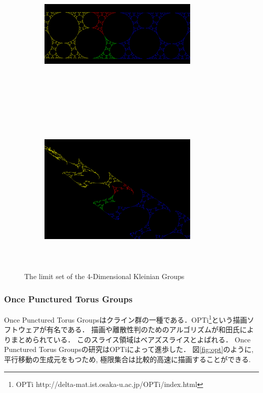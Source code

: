 \begin{figure}[h!tbp]
 \begin{subfigure}{0.49\hsize}
   \begin{center}
    \includegraphics[width=3in, height=3in, keepaspectratio]{../img/klein/sakugawa1.pdf}
    \caption{}
    \label{fig:sakugawa1}
   \end{center}
 \end{subfigure}
 \hspace*{\fill}
 \begin{subfigure}{0.49\hsize}
   \begin{center}
    \includegraphics[width=3in, height=3in, keepaspectratio]{../img/klein/sakugawa2.pdf}
    \caption{}
    \label{fig:sakugawa2}
   \end{center}
 \end{subfigure}
 \caption{The limit set of the 4-Dimensional Kleinian Groups}
 \label{fig:sakugawa}
\end{figure}

\subsubsection{Once Punctured Torus Groups}
Once Punctured Torus Groupsはクライン群の一種である．OPTi\footnote{OPTi http://delta-mat.ist.osaka-u.ac.jp/OPTi/index.html}という描画ソフトウェアが有名である．
描画\cite{OPTiDrawing}や離散性判\cite{OPTiDiscrete}のためのアルゴリズムが和田氏によりまとめられている．
このスライス領域はベアズスライスとよばれる．
Once Punctured Torus Groupsの研究はOPTiによって進歩した．
図\ref{fig:opt}のように, 平行移動の生成元をもつため, 極限集合は比較的高速に描画することができる.  

